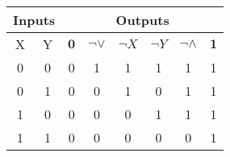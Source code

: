 \begin{table}[]
\begin{tabular}{|cc|cccccc|}
\hline
\multicolumn{2}{|c|}{Inputs} & \multicolumn{6}{c|}{Outputs}                                                                                                                                                             \\ \hline
\multicolumn{1}{|c|}{X}  & Y & \multicolumn{1}{c|}{$\mathbf{0}$} & \multicolumn{1}{c|}{$\neg \lor$} & \multicolumn{1}{c|}{$\neg X$} & \multicolumn{1}{c|}{$ \neg Y$} & \multicolumn{1}{c|}{$\neg \land$} & $\mathbf{1}$ \\ \hline
0                        & 0 & \multicolumn{1}{c|}{0}            & \multicolumn{1}{c|}{1}           & \multicolumn{1}{c|}{1}        & \multicolumn{1}{c|}{1}         & \multicolumn{1}{c|}{1}            & 1            \\
0                        & 1 & \multicolumn{1}{c|}{0}            & \multicolumn{1}{c|}{0}           & \multicolumn{1}{c|}{1}        & \multicolumn{1}{c|}{0}         & \multicolumn{1}{c|}{1}            & 1            \\
1                        & 0 & \multicolumn{1}{c|}{0}            & \multicolumn{1}{c|}{0}           & \multicolumn{1}{c|}{0}        & \multicolumn{1}{c|}{1}         & \multicolumn{1}{c|}{1}            & 1            \\
1                        & 1 & \multicolumn{1}{c|}{0}            & \multicolumn{1}{c|}{0}           & \multicolumn{1}{c|}{0}        & \multicolumn{1}{c|}{0}         & \multicolumn{1}{c|}{0}            & 1            \\ \hline
\end{tabular}
\end{table}
